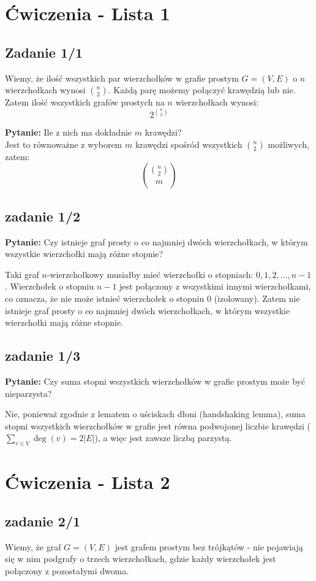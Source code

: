 \documentclass{article}
\begin{document}
\section*{Ćwiczenia - Lista 1}

\subsection*{Zadanie 1/1}

Wiemy, że ilość wszystkich par wierzchołków w grafie prostym $G = (V, E)$ o $n$ wierzchołkach wynosi $\binom{n}{2}$.
Każdą parę możemy połączyć krawędzią lub nie.
Zatem ilość wszystkich grafów prostych na $n$ wierzchołkach wynosi:
\[
2^{\binom{n}{2}}
\]

\textbf{Pytanie:} Ile z nich ma dokładnie $m$ krawędzi? \\
Jest to równoważne z wyborem $m$ krawędzi spośród wszystkich $\binom{n}{2}$ możliwych, zatem:
\[
\binom{\binom{n}{2}}{m}
\]

\subsection*{zadanie 1/2}
\textbf{Pytanie:} Czy istnieje graf prosty o co najmniej dwóch wierzchołkach, w którym wszystkie wierzchołki mają różne stopnie?

Taki graf $n$-wierzchołkowy musiałby mieć wierzchołki o stopniach: $0, 1, 2, \dots, n-1$.
Wierzchołek o stopniu $n-1$ jest połączony z wszystkimi innymi wierzchołkami, co oznacza, że nie może istnieć wierzchołek o stopniu 0 (izolowany).
Zatem nie istnieje graf prosty o co najmniej dwóch wierzchołkach, w którym wszystkie wierzchołki mają różne stopnie.

\subsection*{zadanie 1/3}
\textbf{Pytanie:} Czy suma stopni wszystkich wierzchołków w grafie prostym może być nieparzysta?

Nie, ponieważ zgodnie z lematem o uściskach dłoni (handshaking lemma), suma stopni wszystkich wierzchołków w grafie jest równa podwojonej liczbie krawędzi ($ \sum_{v \in V} \deg(v) = 2|E| $), a więc jest zawsze liczbą parzystą.

\newpage
\section*{Ćwiczenia - Lista 2}
\subsection*{zadanie 2/1}
Wiemy, że graf $G = (V, E)$ jest grafem prostym bez trójkątów - nie pojawiają się w nim podgrafy o trzech wierzchołkach, gdzie każdy wierzchołek jest połączony z pozostałymi dwoma.
\end{document}
